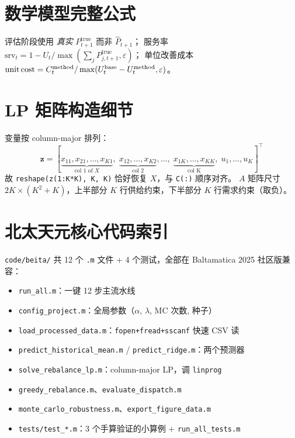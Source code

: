 \documentclass[12pt,a4paper]{article}
\begin{document}
\section{数学模型完整公式}\label{app:math}
评估阶段使用 \emph{真实} $P^{\text{true}}_{t+1}$ 而非 $\widehat P_{t+1}$；
服务率
$\text{srv}_t = 1 - U_t / \max(\sum_j P^{\text{true}}_{j,t+1}, \varepsilon)$；
单位改善成本
$\text{unit\,cost} = C_t^{\text{method}} / \max(U_t^{\text{base}} - U_t^{\text{method}},
\varepsilon)$。

\section{LP 矩阵构造细节}\label{app:lp-matrix}
变量按 column-major 排列：
$$
\mathbf{z} = [\underbrace{x_{11}, x_{21}, \dots, x_{K1}}_{\text{col 1 of } X},\;
              \underbrace{x_{12}, \dots, x_{K2}}_{\text{col 2}}, \dots,\;
              \underbrace{x_{1K}, \dots, x_{KK}}_{\text{col K}},\;
              u_1, \dots, u_K]^\top
$$
故 \verb|reshape(z(1:K*K), K, K)| 恰好恢复 $X$，与 \verb|C(:)| 顺序对齐。
$A$ 矩阵尺寸 $2K \times (K^2 + K)$，上半部分 $K$ 行供给约束，下半部分 $K$ 行需求约束（取负）。

\section{北太天元核心代码索引}\label{app:beita}
\verb|code/beita/| 共 12 个 \verb|.m| 文件 + 4 个测试，全部在 Baltamatica 2025 社区版兼容：
\begin{itemize}\small
\item \verb|run_all.m|：一键 12 步主流水线
\item \verb|config_project.m|：全局参数（$\alpha$, $\lambda$, MC 次数, 种子）
\item \verb|load_processed_data.m|：\verb|fopen+fread+sscanf| 快速 CSV 读
\item \verb|predict_historical_mean.m| / \verb|predict_ridge.m|：两个预测器
\item \verb|solve_rebalance_lp.m|：column-major LP，调 \verb|linprog|
\item \verb|greedy_rebalance.m|、\verb|evaluate_dispatch.m|
\item \verb|monte_carlo_robustness.m|、\verb|export_figure_data.m|
\item \verb|tests/test_*.m|：3 个手算验证的小算例 + \verb|run_all_tests.m|
\end{itemize}
\end{document}
